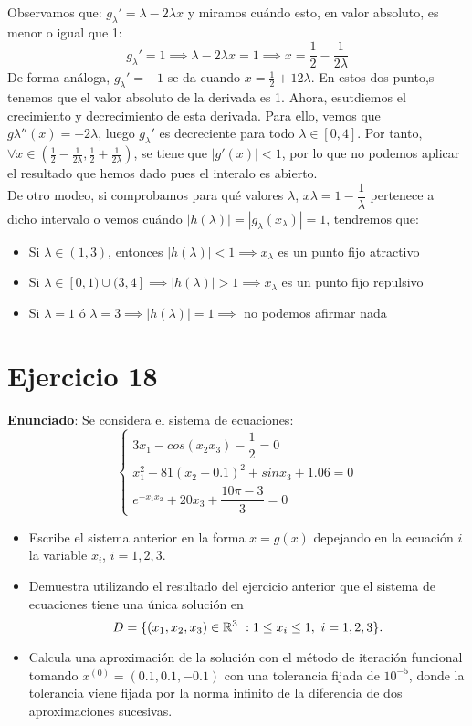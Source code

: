 \documentclass[11pt]{article}
\begin{document}
\begin{itemize}
Observamos que: $g_\lambda'= \lambda - 2\lambda x$ y miramos cuándo esto, en valor absoluto, es menor o igual que 1:
\[
g_\lambda ' = 1 \implies \lambda - 2\lambda x = 1 \implies x = \frac{1}{2} - \frac{1}{2\lambda}
\]
De forma análoga, $g_\lambda' = -1 $ se da cuando $x = \frac{1}{2} + {1}{2\lambda}$.
	En estos dos punto,s tenemos que el valor absoluto de la derivada es 1. Ahora, esutdiemos el crecimiento y decrecimiento de esta derivada. Para ello, vemos que $g\lambda''(x) = -2 \lambda$, luego $g_\lambda'$ es decreciente para todo $\lambda \in [0,4]$. Por tanto, $\forall x \in(\frac{1}{2}-\frac{1}{2\lambda},\frac{1}{2}+\frac{1}{2\lambda})$, se tiene que $|g'(x)| < 1$, por lo que no podemos aplicar el resultado que hemos dado pues el interalo es abierto.\\
	
	De otro modeo, si comprobamos para qué valores $\lambda$, $x\lambda = 1 - \dfrac{1}{\lambda}$ pertenece a dicho intervalo o vemos cuándo $|h(\lambda)| = |g_\lambda(x_\lambda)| = 1$, tendremos que:
	
	\begin{itemize}
	\item Si $\lambda \in (1,3)$, entonces $|h(\lambda)| < 1 \implies x_\lambda$ es un punto fijo atractivo
	\item Si $\lambda \in [0,1) \cup (3,4] \implies |h(\lambda)| > 1 \implies x_\lambda$ es un punto fijo repulsivo
	\item Si $\lambda = 1$ ó $\lambda = 3 \implies |h(\lambda)| = 1 \implies$ no podemos afirmar nada
\end{itemize}
	
\end{itemize}

\section{Ejercicio 18}
\textbf{Enunciado}:
Se considera el sistema de ecuaciones:
\[
\begin{cases}
	3x_1 - cos(x_2x_3) - \dfrac{1}{2} = 0\\
	 x_1^2 -81(x_2+0.1)^2 + sinx_3 +1.06 = 0\\
	 e^{-x_1x_2}+20x_3+\dfrac{10\pi-3}{3} = 0
\end{cases}
\] 
\begin{itemize}
	\item Escribe el sistema anterior en la forma $x=g(x)$ depejando en la ecuación $i$ la variable $x_i$, $i=1,2,3$.
	\item Demuestra utilizando el resultado del ejercicio anterior que el sistema de ecuaciones tiene una única solución en 
	\[
	D = \{(x_1,x_2,x_3) \in \mathbb R^3 \ : \- 1 \leq x_i \leq 1, \ i = 1,2,3\}.
	\]
	
	\item Calcula una aproximación de la solución con el método de iteración funcional tomando $x^{(0)} = (0.1,0.1,-0.1)$ con una tolerancia fijada de $10^{-5}$, donde la tolerancia viene fijada por la norma infinito de la diferencia de dos aproximaciones sucesivas.

\end{itemize}
\end{document}
